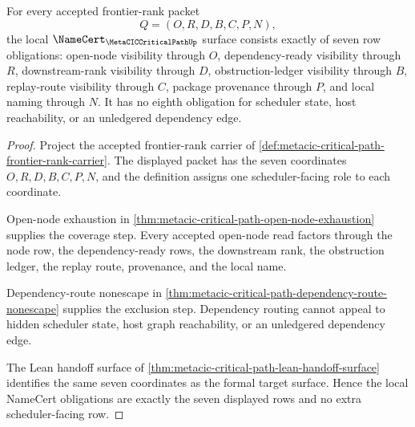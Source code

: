 \begin{theorem}
\label{thm:metacic-critical-path-frontier-rank-namecert-obligations}
For every accepted frontier-rank packet
$$
Q=(O,R,D,B,C,P,N),
$$
the local $\NameCert_{\MetaCICCriticalPathUp}$ surface consists exactly of seven row obligations: open-node visibility through $O$, dependency-ready visibility through $R$, downstream-rank visibility through $D$, obstruction-ledger visibility through $B$, replay-route visibility through $C$, package provenance through $P$, and local naming through $N$. It has no eighth obligation for scheduler state, host reachability, or an unledgered dependency edge.
\end{theorem}
\begin{proof}
Project the accepted frontier-rank carrier of \autoref{def:metacic-critical-path-frontier-rank-carrier}. The displayed packet has the seven coordinates $O,R,D,B,C,P,N$, and the definition assigns one scheduler-facing role to each coordinate.

Open-node exhaustion in \autoref{thm:metacic-critical-path-open-node-exhaustion} supplies the coverage step. Every accepted open-node read factors through the node row, the dependency-ready rows, the downstream rank, the obstruction ledger, the replay route, provenance, and the local name.

Dependency-route nonescape in \autoref{thm:metacic-critical-path-dependency-route-nonescape} supplies the exclusion step. Dependency routing cannot appeal to hidden scheduler state, host graph reachability, or an unledgered dependency edge.

The Lean handoff surface of \autoref{thm:metacic-critical-path-lean-handoff-surface} identifies the same seven coordinates as the formal target surface. Hence the local NameCert obligations are exactly the seven displayed rows and no extra scheduler-facing row.
\end{proof}

